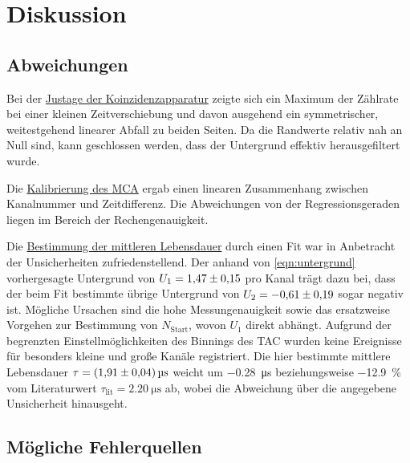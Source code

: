 \section{Diskussion}
\label{sec:diskussion}

\subsection{Abweichungen}
Bei der \hyperref[sec:auswertung:koinzidenz]{Justage der Koinzidenzapparatur} zeigte sich
ein Maximum der Zählrate bei einer kleinen Zeitverschiebung
und davon ausgehend ein symmetrischer, weitestgehend linearer Abfall zu beiden Seiten.
Da die Randwerte relativ nah an Null sind,
kann geschlossen werden,
dass der Untergrund effektiv herausgefiltert wurde.


Die \hyperref[sec:auswertung:mca]{Kalibrierung des \acs{MCA}} ergab einen linearen Zusammenhang zwischen Kanalnummer und Zeitdifferenz.
Die Abweichungen von der Regressionsgeraden liegen im Bereich der Rechengenauigkeit.

Die \hyperref[sec:auswertung:lebensdauer]{Bestimmung der mittleren Lebensdauer} durch einen Fit war in Anbetracht der Unsicherheiten zufriedenstellend.
Der anhand von \autoref{eqn:untergrund} vorhergesagte Untergrund von
$U_1 = \num{1.47 \pm 0.15}$ pro Kanal
trägt dazu bei, dass der beim Fit bestimmte übrige Untergrund von
$U_2 = \num{-0.61 \pm 0.19}$
sogar negativ ist.
Mögliche Ursachen sind die hohe Messungenauigkeit sowie das ersatzweise Vorgehen zur Bestimmung von $N_\text{Start}$,
wovon $U_1$ direkt abhängt.
%
Aufgrund der begrenzten Einstellmöglichkeiten des Binnings des \ac{TAC} wurden keine Ereignisse für besonders kleine und große Kanäle registriert.
Die hier bestimmte mittlere Lebensdauer $\tau = \SI{1.91 \pm 0.04}{\micro\second}$
weicht um \SI{-0.28}{\micro\second} beziehungsweise \SI{-12.9}{\percent} vom Literaturwert $\tau_\text{lit} = \SI{2.20}{\micro\second}$ \cite{pdg} ab,
wobei die Abweichung über die angegebene Unsicherheit hinausgeht.


\subsection{Mögliche Fehlerquellen}

